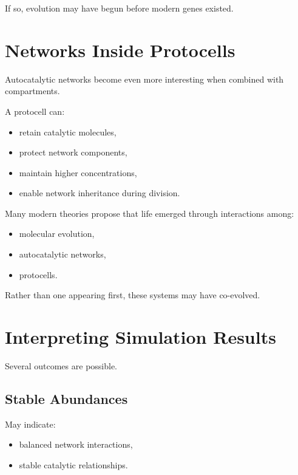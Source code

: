 \documentclass[
  oneside,
  openany]{book}
\providecommand{\tightlist}{%
  \setlength{\itemsep}{0pt}\setlength{\parskip}{0pt}}
\begin{document}
If so, evolution may have begun before modern genes existed.

\section{Networks Inside Protocells}\label{networks-inside-protocells}

Autocatalytic networks become even more interesting when combined with compartments.

A protocell can:

\begin{itemize}
\tightlist
\item
  retain catalytic molecules,
\item
  protect network components,
\item
  maintain higher concentrations,
\item
  enable network inheritance during division.
\end{itemize}

Many modern theories propose that life emerged through interactions among:

\begin{itemize}
\tightlist
\item
  molecular evolution,
\item
  autocatalytic networks,
\item
  protocells.
\end{itemize}

Rather than one appearing first, these systems may have co-evolved.

\section{Interpreting Simulation Results}\label{interpreting-simulation-results-2}

Several outcomes are possible.

\subsection{Stable Abundances}\label{stable-abundances}

May indicate:

\begin{itemize}
\tightlist
\item
  balanced network interactions,
\item
  stable catalytic relationships.
\end{itemize}
\end{document}

